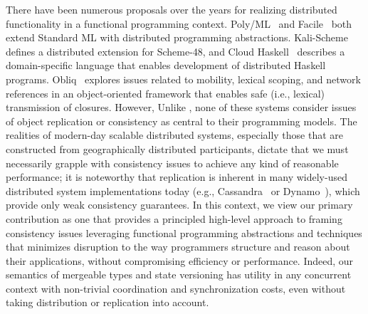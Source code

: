 There have been numerous proposals over the years for realizing
distributed functionality in a functional programming context.
Poly/ML~\cite{Mat97} and Facile~\cite{TLK+97} both extend Standard ML
with distributed programming abstractions.  Kali-Scheme~\cite{CJK95}
defines a distributed extension for Scheme-48, and Cloud
Haskell~\cite{EPPJ11} describes a domain-specific language that
enables development of distributed Haskell programs.
Obliq~\cite{Car95} explores issues related to mobility, lexical
scoping, and network references in an object-oriented framework that
enables safe (i.e., lexical) transmission of closures.  However,
Unlike \name, none of these systems consider issues of object
replication or consistency as central to their programming models.
The realities of modern-day scalable distributed systems, especially
those that are constructed from geographically distributed
participants, dictate that we must necessarily grapple with
consistency issues to achieve any kind of reasonable performance; it
is noteworthy that replication is inherent in many widely-used
distributed system implementations today (e.g.,
Cassandra~\cite{Cassandra} or Dynamo~\cite{Dynamo}), which provide
only weak consistency guarantees.  In this context, we view our
primary contribution as one that provides a principled high-level
approach to framing consistency issues leveraging functional
programming abstractions and techniques that minimizes disruption to
the way programmers structure and reason about their applications,
without compromising efficiency or performance.  Indeed, our semantics
of mergeable types and state versioning has utility in any concurrent
context with non-trivial coordination and synchronization costs, even
without taking distribution or replication into account.
